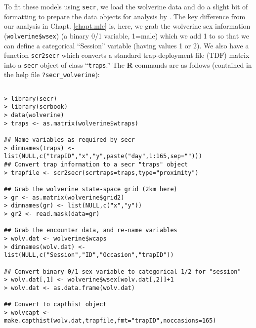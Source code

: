 To fit these models using \mbox{\tt secr}, 
we load the wolverine data and do 
a slight bit of formatting to prepare the data objects for analysis by
\mbox{\secr}. The key difference from our analysis in
Chapt. \ref{chapt.mle} is, here, we grab the wolverine sex information
(\mbox{\tt wolverine\$wsex}) (a binary 0/1 variable, 1=male) which we add
1 to so that we can define a categorical  ``Session'' variable (having
values 1 or 2). We also have a function \mbox{\tt scr2secr} which
converts a standard trap-deployment file (TDF) matrix into a \mbox{\tt secr}
object of class ``\mbox{\tt traps}.''
The {\bf R} commands are as follows (contained in the help file
\mbox{\tt ?secr\_wolverine}): 
{\small
\begin{verbatim}

> library(secr)
> library(scrbook)
> data(wolverine)
> traps <- as.matrix(wolverine$wtraps)

## Name variables as required by secr
> dimnames(traps) <- list(NULL,c("trapID","x","y",paste("day",1:165,sep="")))
## Convert trap information to a secr "traps" object
> trapfile <- scr2secr(scrtraps=traps,type="proximity")

## Grab the wolverine state-space grid (2km here)
> gr <- as.matrix(wolverine$grid2)
> dimnames(gr) <- list(NULL,c("x","y"))
> gr2 <- read.mask(data=gr)

## Grab the encounter data, and re-name variables
> wolv.dat <- wolverine$wcaps
> dimnames(wolv.dat) <- list(NULL,c("Session","ID","Occasion","trapID"))

## Convert binary 0/1 sex variable to categorical 1/2 for "session"
> wolv.dat[,1] <- wolverine$wsex[wolv.dat[,2]]+1
> wolv.dat <- as.data.frame(wolv.dat)

## Convert to capthist object
> wolvcapt <- make.capthist(wolv.dat,trapfile,fmt="trapID",noccasions=165)
\end{verbatim}
}


